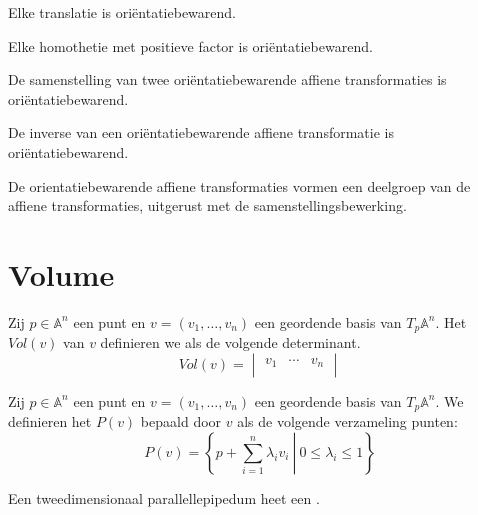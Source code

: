 \documentclass[main.tex]{subfiles}
\begin{document}
\begin{st}
  Elke translatie is ori\"entatiebewarend.
\end{st}

\begin{st}
  Elke homothetie met positieve factor is ori\"entatiebewarend.
\end{st}

\begin{st}
  De samenstelling van twee ori\"entatiebewarende affiene transformaties is ori\"entatiebewarend.
\end{st}

\begin{st}
  De inverse van een ori\"entatiebewarende affiene transformatie is ori\"entatiebewarend.
\end{st}

\begin{st}
  De orientatiebewarende affiene transformaties vormen een deelgroep van de affiene transformaties, uitgerust met de samenstellingsbewerking.
\end{st}

\section{Volume}
\label{sec:volume}

\begin{de}
  Zij $p\in \mathbb{A}^{n}$ een punt en $v= (v_{1},\dotsc,v_{n})$ een geordende basis van $T_{p}\mathbb{A}^{n}$.
  Het  $Vol(v)$ van $v$ definieren we als de volgende determinant.
  \[
  Vol(v) = 
  \begin{vmatrix}
    v_{1} & \cdots & v_{n}\\
  \end{vmatrix}
  \]
\end{de}

\begin{de}
  Zij $p\in \mathbb{A}^{n}$ een punt en $v= (v_{1},\dotsc,v_{n})$ een geordende basis van $T_{p}\mathbb{A}^{n}$.
  We definieren het  $P(v)$ bepaald door $v$ als de volgende verzameling punten:
  \[ P(v) = \left\{\left. p + \sum_{i=1}^{n}\lambda_{i}v_{i} \ \right|\ 0 \le \lambda_{i} \le 1 \right\} \]
\end{de}

\begin{de}
  Een tweedimensionaal parallellepipedum heet een .
\end{de}
\end{document}
